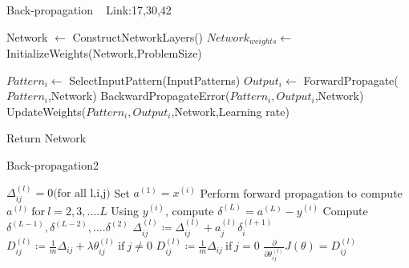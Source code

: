 \documentclass[a4paper]{article}
\begin{document}
  \begin{algorithm}
   \caption{Back-propagation  ~\cite{backpropagation12} Link:17,30,42}
    \begin{algorithmic}[1]
     \State Network $\leftarrow$ ConstructNetworkLayers()
     \State $Network_{weights} \leftarrow$ InitializeWeights(Network,ProblemSize)
    
            \State $Pattern_i \leftarrow$ SelectInputPattern(InputPatterns)
            \State $Output_i \leftarrow $ ForwardPropagate($Pattern_i$,Network)
            \State BackwardPropagateError($Pattern_i,Output_i$,Network)
            \State UpdateWeights($Pattern_i,Output_i$,Network,Learning rate)
        \EndFor
        
       
       \State Return Network



 

\end{algorithmic}
\end{algorithm}


\begin{algorithm}
   \caption{Back-propagation2 ~\cite{backpropagation2} }
    \begin{algorithmic}[1]
    \State $\Delta_{ij}^{(l)} = 0 \text{(for all l,i,j)}$
     \State Set $a^{(1)} = x ^ {(i)}$
     \State Perform forward propagation to compute $a^{(l)} \  \text{for} \  l =2,3,....L$
     \State Using $y^(i)$, compute $\delta^(L) = a^(L) - y^(i)$
     \State Compute $\delta^(L-1),\delta^(L-2),....\delta^(2) $
    \State $\Delta_{ij}^{(l)} \coloneqq \Delta_{ij}^{(l)} + a_{j}^{(l)}\delta_{i}^{(l+1)} $
      \EndFor
      \State $D_{ij}^{(l)} \coloneqq \frac{1}{m} \Delta_{ij} + \lambda \theta_{ij}^{(l)} \  \text{if}\  j \neq 0 $
      \State $D_{ij}^{(l)} \coloneqq \frac{1}{m} \Delta_{ij} \  \text{if}\  j = 0 $
      \State $\frac{\partial}{\partial\theta_{ij}^{(l)}}J(\theta) = D_{ij}^(l)$ 
      
    
    
    
\end{algorithmic}
\end{algorithm}
\end{document}
